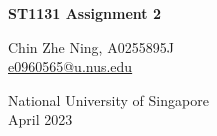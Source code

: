 

\begin{titlepage}
    \begin{center}
        \vspace*{1cm}
            
        \Huge
        \textbf{ ST1131 Assignment 2}
            
        \vspace{0.5cm}
            
        \vspace{1.5cm}

        \LARGE
        Chin Zhe Ning, A0255895J \\
        \href{mailto:e0960565@u.nus.edu}{e0960565@u.nus.edu}{}
            
        \vfill
            
        \Large
        National University of Singapore\\
        April 2023
            
    \end{center}
\end{titlepage}